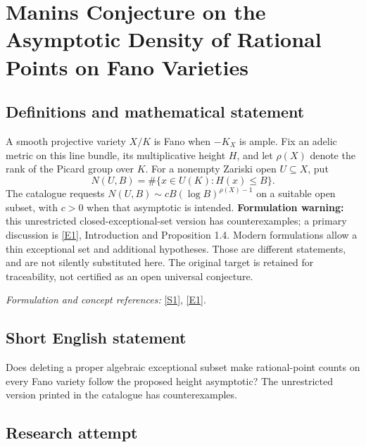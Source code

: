 \documentclass[11pt,a4paper]{article}
\newcommand{\sref}[2]{\hyperlink{source:#1:#2}{[S#2]}}
\newcommand{\eref}[2]{\hyperlink{extra:#1:#2}{[E#2]}}
\newif\ifshowcatalogue
\newcommand{\cataloguescope}[1]{\ifshowcatalogue
 \paragraph{Exact scope in the supplied catalogue.}
 \begin{quote}\small #1\end{quote}\fi}
\numberwithin{equation}{section}
\begin{document}
\setcounter{section}{0}
\clearpage
\section*{\texorpdfstring{Manins Conjecture on the Asymptotic Density of Rational Points on Fano Varieties}{Manins Conjecture on the Asymptotic Density of Rational Points on Fano Varieties}}\label{30006760}
\subsection{Definitions and mathematical statement}
A smooth projective variety $X/K$ is Fano when $-K_X$ is ample. Fix an adelic metric on this line bundle, its multiplicative height $H$, and let $\rho(X)$ denote the rank of the Picard group over $K$. For a nonempty Zariski open $U\subseteq X$, put
\[
 N(U,B)=\#\{x\in U(K):H(x)\le B\}.
\]
The catalogue requests $N(U,B)\sim cB(\log B)^{\rho(X)-1}$ on a suitable open subset, with $c>0$ when that asymptotic is intended. \textbf{Formulation warning:} this unrestricted closed-exceptional-set version has counterexamples; a primary discussion is \eref{30006760}{1}, Introduction and Proposition 1.4. Modern formulations allow a thin exceptional set and additional hypotheses. Those are different statements, and are not silently substituted here. The original target is retained for traceability, not certified as an open universal conjecture.
\par\smallskip\textit{Formulation and concept references:} \sref{30006760}{1}, \eref{30006760}{1}.
\cataloguescope{Prove that for any smooth Fano variety X over a number field K with ample anticanonical bundle, the number of rational points of anticanonical height <= B on a Zariski open subset satisfies N(U, B) \textasciitilde{} c B (log B)\textasciicircum{}\{rho(X)-1\}.}
\subsection{Short English statement}
Does deleting a proper algebraic exceptional subset make rational-point counts on every Fano variety follow the proposed height asymptotic? The unrestricted version printed in the catalogue has counterexamples.
\subsection{Research attempt}
\end{document}
